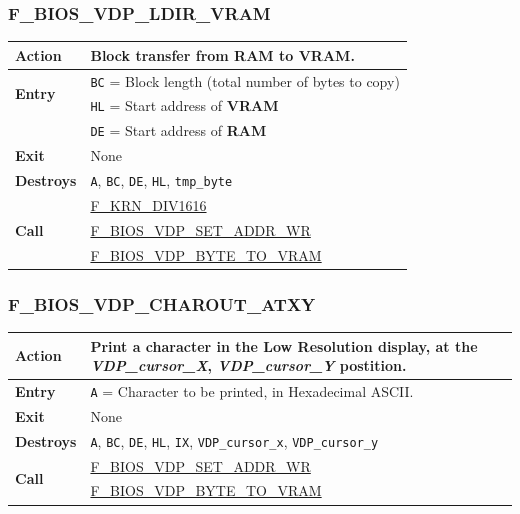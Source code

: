 \documentclass[a4paper,11pt]{article}
\begin{document}
        \subsubsection{F\_BIOS\_VDP\_LDIR\_VRAM}
        \label{func:fbiosvdpldirvram}
        \begin{tabular}{l p{9cm}}
            \hline\textbf{Action}
            & Block transfer from \textbf{RAM} to \textbf{VRAM}.\\
            \hline\multirow[t]{2}{4em}{\textbf{Entry}} & \texttt{BC} = Block 
            length (total number of bytes to copy)\\
            & \texttt{HL} = Start address of \textbf{VRAM}\\
            & \texttt{DE} = Start address of \textbf{RAM}\\
            \hline\textbf{Exit} & None\\
            \hline\textbf{Destroys} & \texttt{A}, \texttt{BC}, \texttt{DE},
            \texttt{HL}, \texttt{tmp\_byte}\\
            \hline\multirow[t]{3}{4em}{\textbf{Call}}
            & \hyperref[func:fkrndiv1616]{F\_KRN\_DIV1616}\\
            & \hyperref[func:fbiosvdpsetaddrwr]{F\_BIOS\_VDP\_SET\_ADDR\_WR}\\
            & \hyperref[func:fbiosvdpbytetovram]{F\_BIOS\_VDP\_BYTE\_TO\_VRAM}\\
            \hline
        \end{tabular}

        \subsubsection{F\_BIOS\_VDP\_CHAROUT\_ATXY}
        \label{func:fbiosvdpcharoutatxy}
        \begin{tabular}{l p{9cm}}
            \hline\textbf{Action}
            & Print a character in the \textbf{Low Resolution display}, at the
            \textit{VDP\_cursor\_X}, \textit{VDP\_cursor\_Y} postition.\\
            \hline\textbf{Entry} & \texttt{A} = Character to be printed, in
            Hexadecimal ASCII.\\
            \hline\textbf{Exit} & None\\
            \hline\textbf{Destroys} & \texttt{A}, \texttt{BC}, \texttt{DE},
            \texttt{HL}, \texttt{IX}, \texttt{VDP\_cursor\_x},
            \texttt{VDP\_cursor\_y}\\
            \hline\multirow[t]{2}{4em}{\textbf{Call}}
            & \hyperref[func:fbiosvdpsetaddrwr]{F\_BIOS\_VDP\_SET\_ADDR\_WR}\\
            & \hyperref[func:fbiosvdpbytetovram]{F\_BIOS\_VDP\_BYTE\_TO\_VRAM}\\
            \hline
        \end{tabular}
\end{document}

